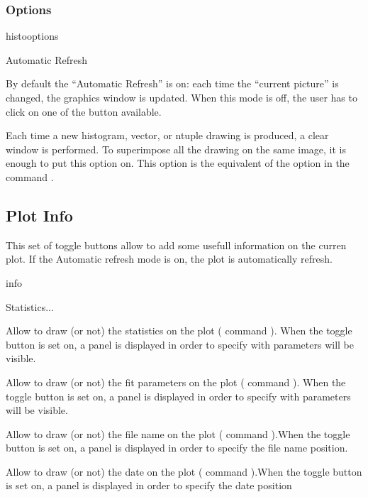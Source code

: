 \subsubsection{Options}

\begin{PAWf}{histooptions}
\begin{DLsf}{Automatic Refresh}
\item[Automatic Refresh] By default the ``Automatic Refresh'' is on: each
                         time the ``current picture'' is changed, the graphics
                         window is updated. When this mode is off, the user
                         has to click on one of the  button
                         available. 
\item[Overlay] Each time a new histogram, vector, or ntuple drawing is
               produced, a clear window is performed. To superimpose
               all the drawing on the same image, it is enough to put this
               option on. This option is the equivalent of the option
                in the command .
\end{DLsf}
\end{PAWf}

\subsection{Plot Info}
This set of toggle buttons allow to add some usefull information on the
curren plot. If the Automatic refresh mode is on, the plot is automatically
refresh.

\begin{PAWf}{info}
\begin{DLsf}{Statistics...}
\item[Statistics...]  Allow to draw (or not) the statistics on the plot
                      (\XPAW{} command ). When the toggle
                      button is set on, a panel is displayed in order to
                      specify with parameters will be visible.
\item[Fits...]        Allow to draw (or not) the fit parameters on the plot
                      (\XPAW{} command ). When the toggle
                      button is set on, a panel is displayed in order to
                      specify with parameters will be visible.
\item[File Name...]   Allow to draw (or not) the file name on the plot
                      (\XPAW{} command ).When the toggle
                      button is set on, a panel is displayed in order to
                      specify the file name position.
\item[Date...]        Allow to draw (or not) the date on the plot
                      (\XPAW{} command ).When the toggle
                      button is set on, a panel is displayed in order to
                      specify the date position
\end{DLsf}
\end{PAWf}



